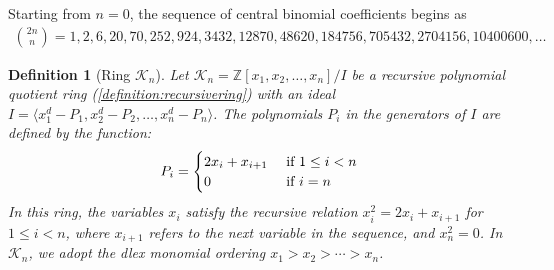 \documentclass[12pt,reqno]{article}
\theoremstyle{plain}
\newtheorem{definition}[theorem]{Definition}
\newcommand{\Z}{\mathbb{Z}}
\newcommand{\K}{\mathcal{K}}
\begin{document}
Starting from $n=0$, the sequence of central binomial coefficients begins as
\begin{align*}
    \binom{2n}{n} = 1, 2, 6, 20, 70, 252, 924, 3432, 12870, 48620, 184756, 705432, 2704156, 10400600, \ldots
\end{align*}

\begin{definition}[Ring $\K_n$] \label{definition:ring}
Let $\K_n = \Z[x_1, x_2, \ldots, x_n]/I$ be a recursive polynomial quotient ring (\cref{definition:recursivering}) with an ideal $I = \langle x_1^d - P_1, x_2^d - P_2, \ldots, x_n^d - P_n \rangle$. The polynomials $P_i$ in the generators of $I$ are defined by the function:
\begin{displaymath}
P_i =
\begin{cases}
    2x_i + x_{i+1} & \textup{ if } 1 \leq i < n \\
    0 &\textup{ if } i = n
\end{cases}
\end{displaymath}
In this ring, the variables $x_i$ satisfy the recursive relation $x_i^2 = 2x_i + x_{i+1}$ for $1 \leq i < n$, where $x_{i+1}$ refers to the next variable in the sequence, and $x_n^2 = 0$. In $\K_n$, we adopt the dlex monomial ordering $x_1 > x_2 > \cdots > x_n$.
\end{definition}
\end{document}
